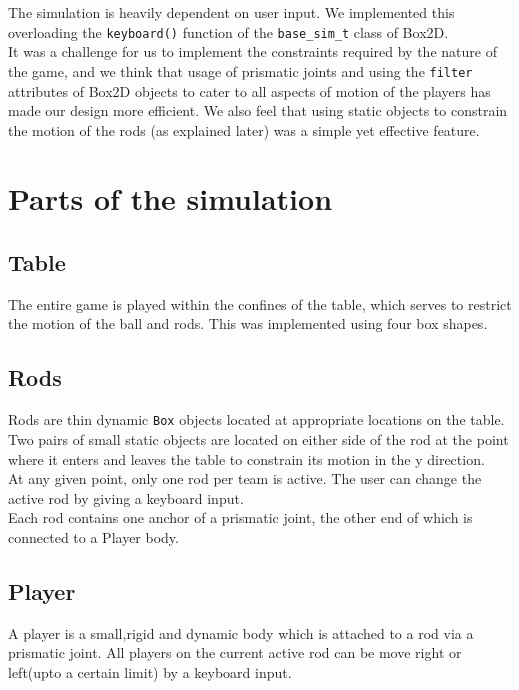 \documentclass{article}
\begin{document}
The simulation is heavily dependent on user input. We implemented this overloading the \texttt{keyboard()} function of the \texttt{base\_sim\_t} class of Box2D.\\

It was a challenge for us to implement the constraints required by the nature of the game, and we think that usage of prismatic joints and using the \texttt{filter} attributes of Box2D objects to cater to all aspects of motion of the players has made our design more efficient. We also feel that using static objects to constrain the motion of the rods (as explained later) was a simple yet effective feature.\\

\section{Parts of the simulation}

\subsection{Table}
The entire game is played within the confines of the table, which serves to restrict the motion of the ball and rods. This was implemented using four box shapes.\\

\subsection{Rods}
Rods are thin dynamic \texttt{Box} objects located at appropriate locations on the table. Two pairs of small static objects are located on either side of the rod at the point where it enters and leaves the table to constrain its motion in the y direction.\\

At any given point, only one rod per team is active. The user can change the active rod by giving a keyboard input.\\

Each rod contains one anchor of a prismatic joint, the other end of which is connected to a Player body.\\

\subsection{Player}
A player is a small,rigid and dynamic body which is attached to a rod via a prismatic joint. All players on the current active rod can be move right or left(upto a certain limit) by a keyboard input.\\
\end{document}
